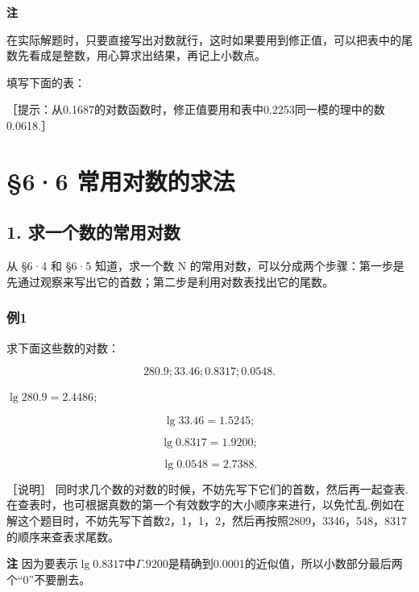 \textbf{注}

在实际解题时，只要直接写出对数就行，这时如果要用到修正值，可以把表中的尾数先看成是整数，用心算求出结果，再记上小数点。

填写下面的表：

{\centering
\small\setlength{\tabcolsep}{3pt}%
\par
}

［提示：从0.1687的对数函数时，修正值要用和表中0.2253同一模的理中的数0.0618.］

\section{§6·6 常用对数的求法}

\subsection{1. 求一个数的常用对数}

从 §6·4 和 §6·5 知道，求一个数 N
的常用对数，可以分成两个步骤：第一步是先通过观察来写出它的首数；第二步是利用对数表找出它的尾数。

\subsubsection{例1}

求下面这些数的对数：

\[
280.9; 33.46; 0.8317; 0.0548.
\]

 \(\lg 280.9 = 2.4486;\)

\[
\lg 33.46 = 1.5245;
\]

\[
\lg 0.8317 = 1.9200;
\]

\[
\lg 0.0548 = 2.7388.
\]

［说明］
同时求几个数的对数的时候，不妨先写下它们的首数，然后再一起查表.在查表时，也可根据真数的第一个有效数字的大小顺序来进行，以免忙乱.例如在解这个题目时，不妨先写下首数2，1，1，2，然后再按照2809，3346，548，8317的顺序来查表求尾数。

\textbf{注}
因为要表示\(\lg 0.8317\)中\(\Gamma.9200\)是精确到0.0001的近似值，所以小数部分最后两个``0''不要删去。

